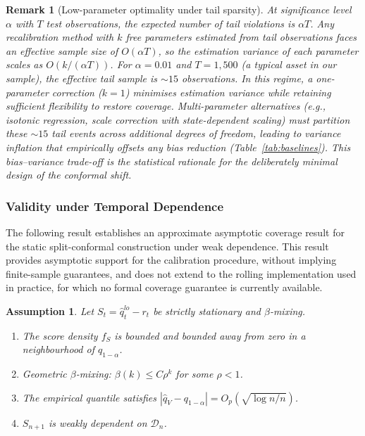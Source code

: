\documentclass[preprint,11pt,authoryear]{elsarticle}
\newtheorem{remark}[theorem]{Remark}
\newtheorem{assumption}[theorem]{Assumption}
\newcommand{\1}{\boldsymbol{1}}
\begin{document}
	\begin{remark}[Low-parameter optimality under tail sparsity]
		\label{rem:tail_sparsity}
		At significance level $\alpha$ with $T$ test observations, the expected number of tail violations is $\alpha T$. Any recalibration method with $k$ free parameters estimated from tail observations faces an effective sample size of $O(\alpha T)$, so the estimation variance of each parameter scales as $O(k / (\alpha T))$. For $\alpha = 0.01$ and $T = 1{,}500$ (a typical asset in our sample), the effective tail sample is ${\sim}15$ observations. In this regime, a one-parameter correction ($k = 1$) minimises estimation variance while retaining sufficient flexibility to restore coverage. Multi-parameter alternatives (e.g., isotonic regression, scale correction with state-dependent scaling) must partition these ${\sim}15$ tail events across additional degrees of freedom, leading to variance inflation that empirically offsets any bias reduction (Table~\ref{tab:baselines}). This bias--variance trade-off is the statistical rationale for the deliberately minimal design of the conformal shift.
	\end{remark}

	\subsubsection{Validity under Temporal Dependence}
	\label{sec:validity}
	
	The following result establishes an approximate asymptotic coverage result for the static split-conformal construction under
	weak dependence. This result provides asymptotic support for the calibration procedure, without implying finite-sample guarantees, and does not extend to the rolling implementation used in practice, for which no formal coverage guarantee is currently available.

	\begin{assumption}\label{ass:main}
		Let $S_t = \hat{q}^{lo}_t - r_t$ be strictly stationary and $\beta$-mixing.
		\begin{enumerate}[label=\textup{(A\arabic*)}]
			\item\label{ass:density} The score density $f_S$ is bounded and bounded away from zero in a neighbourhood of $q_{1-\alpha}$.
			\item\label{ass:mixing} Geometric $\beta$-mixing: $\beta(k) \leq C\rho^k$ for some $\rho < 1$.
			\item\label{ass:quantile} The empirical quantile satisfies $|\hat{q}_V - q_{1-\alpha}| = O_p(\sqrt{\log n / n})$.
			\item\label{ass:weak_dep} $S_{n+1}$ is weakly dependent on $\mathcal{D}_n$.
		\end{enumerate}
	\end{assumption}
\end{document}
